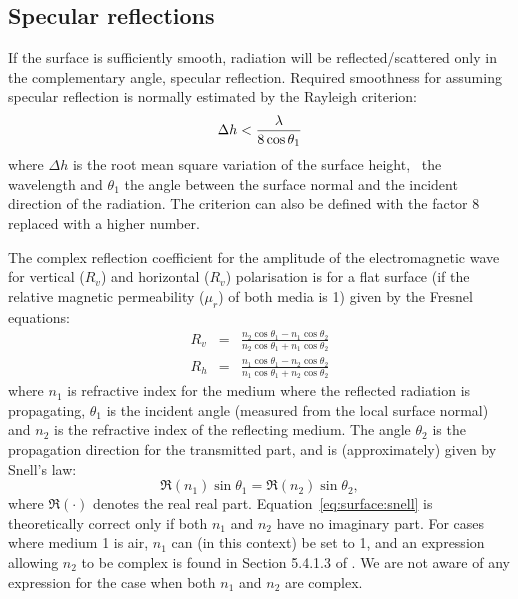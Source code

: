 \subsection{Specular reflections}
 
 If the surface is sufficiently smooth, radiation will be
 reflected/scattered only in the complementary angle, specular
 reflection. Required smoothness for assuming specular reflection is
 normally estimated by the Rayleigh criterion:
 \begin{equation}
   \label{eq:surface:rayleigh}
   \Delta h < \frac{\lambda}{8\cos\theta_1}
 \end{equation}
 where $\Delta h$ is the root mean square variation of the surface
 height, \Wvl\ the wavelength and $\theta_1$ the angle between the
 surface normal and the incident direction of the radiation. The
 criterion can also be defined with the factor 8 replaced with a 
 higher number.
 
 The complex reflection coefficient for the amplitude of the
 electromagnetic wave for vertical ($R_v$) and horizontal ($R_v$)
 polarisation is for a flat surface (if the relative magnetic
 permeability ($\mu_r$) of both media is 1) given by the Fresnel equations:
 \begin{eqnarray}
   \label{eq:surface_fresnel}
   R_v &=& \frac{n_2\cos\theta_1-n_1\cos\theta_2}
                                           {n_2\cos\theta_1+n_1\cos\theta_2} \\
   R_h &=& \frac{n_1\cos\theta_1-n_2\cos\theta_2}
                                           {n_1\cos\theta_1+n_2\cos\theta_2} 
 \end{eqnarray}
 where $n_1$ is refractive index for the medium where the reflected radiation
 is propagating, $\theta_1$ is the incident angle (measured from the local
 surface normal) and $n_2$ is the refractive index of the reflecting medium.
 The angle $\theta_2$ is the propagation direction for the transmitted part,
 and is (approximately) given by Snell's law:
 \begin{equation}
   \label{eq:surface:snell}
   \Re(n_1)\sin\theta_1 = \Re(n_2)\sin\theta_2,
 \end{equation}
 where $\Re(\cdot)$ denotes the real real part. Equation~\ref{eq:surface:snell}
 is theoretically correct only if both $n_1$ and $n_2$ have no imaginary part. 
 For cases where medium 1 is air, $n_1$ can (in this context) be set to 1, and 
an expression allowing $n_2$ to be complex is found in Section 5.4.1.3 of
\citet{liou:02}. We are not aware of any expression for the case when both
$n_1$ and $n_2$ are complex.


